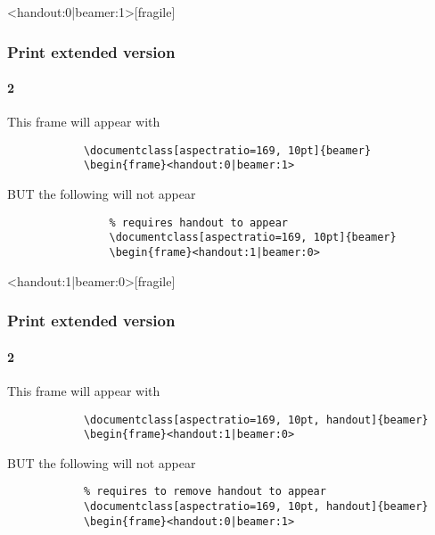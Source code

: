 	\begin{frame}<handout:0|beamer:1>[fragile]
		\frametitle{Print extended version}
		\framesubtitle{2}
		
		This frame will appear with
		\begin{verbatim}			
			\documentclass[aspectratio=169, 10pt]{beamer}
			\begin{frame}<handout:0|beamer:1>
		\end{verbatim}
		
		BUT the following will not appear
		\begin{verbatim}			
				% requires handout to appear
				\documentclass[aspectratio=169, 10pt]{beamer} 
				\begin{frame}<handout:1|beamer:0>
		\end{verbatim}
	\end{frame}
			
	\begin{frame}<handout:1|beamer:0>[fragile]
		\frametitle{Print extended version}
		\framesubtitle{2}
		
		This frame will appear with
		\begin{verbatim}			
			\documentclass[aspectratio=169, 10pt, handout]{beamer}
			\begin{frame}<handout:1|beamer:0>
		\end{verbatim}
		
		BUT the following will not appear
		\begin{verbatim}			
		    % requires to remove handout to appear
			\documentclass[aspectratio=169, 10pt, handout]{beamer} 
			\begin{frame}<handout:0|beamer:1>
		\end{verbatim}
	\end{frame}
